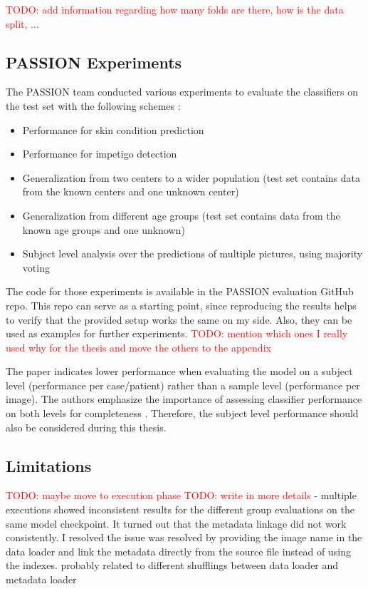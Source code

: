 \documentclass[12pt, a4paper, oneside]{book}   	%
\renewcommand{\todo}[1]{\textcolor{red}{TODO: #1}}
\begin{document}
			  \todo{add information regarding how many folds are there, how is the data split, ...}
			  			
			\subsection{PASSION Experiments}
			  The PASSION team conducted various experiments to evaluate the classifiers on the test set with the following schemes \autocite{Gottfrois2024}:
			  \begin{itemize}
			  	\item Performance for skin condition prediction
			  	\item Performance for impetigo detection
			  	\item Generalization from two centers to a wider population (test set contains data from the known centers and one unknown center)
			  	\item Generalization from different age groups (test set contains data from the known age groups and one unknown)
			  	\item Subject level analysis over the predictions of multiple pictures, using majority voting
			  \end{itemize}
			  
			  The code for those experiments is available in the PASSION evaluation GitHub repo. This repo can serve as a starting point, since reproducing the results helps to verify that the provided setup works the same on my side. Also, they can be used as examples for further experiments. \todo{mention which ones I really used why for the thesis and move the others to the appendix}
			  
			  The paper indicates lower performance when evaluating the model on a subject level (performance per case/patient) rather than a sample level (performance per image). The authors emphasize the importance of assessing classifier performance on both levels for completeness \autocite{Gottfrois2024}. Therefore, the subject level performance should also be considered during this thesis.
	
	
		\subsection{Limitations}
				\todo{maybe move to execution phase}
				\todo{write in more details}
			   - multiple executions showed inconsistent results for the different group evaluations on the same model checkpoint. It turned out that the metadata linkage did not work consistently. I resolved the issue was resolved by providing the image name in the data loader and link the metadata directly from the source file instead of using the indexes. probably related to different shufflings between data loader and metadata loader
		
\end{document}
